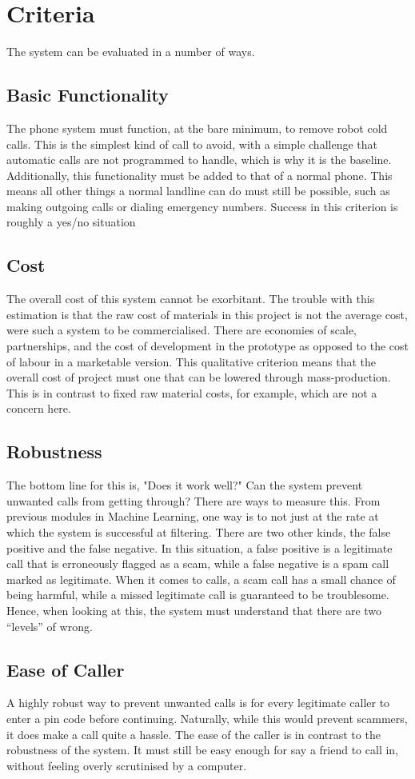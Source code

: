 \documentclass[12pt,a4paper]{report}
\begin{document}
\section{Criteria}
The system can be evaluated in a number of ways.
\subsection{Basic Functionality}
The phone system must function, at the bare minimum, to remove robot cold calls. This is the simplest kind of call to avoid, with a simple challenge that automatic calls are not programmed to handle, which is why it is the baseline. Additionally, this functionality must be added to that of a normal phone. This means all other things a normal landline can do must still be possible, such as making outgoing calls or dialing emergency numbers. Success in this criterion is roughly a yes/no situation
\subsection{Cost}
The overall cost of this system cannot be exorbitant. The trouble with this estimation is that the raw cost of materials in this project is not the average cost, were such a system to be commercialised. There are economies of scale, partnerships, and the cost of development in the prototype as opposed to the cost of labour in a marketable version. This qualitative criterion means that the overall cost of project must one that can be lowered through mass-production. This is in contrast to fixed raw material costs, for example, which are not a concern here.
\subsection{Robustness}
The bottom line for this is, "Does it work well?" Can the system prevent unwanted calls from getting through? There are ways to measure this. From previous modules in Machine Learning, one way is to not just at the rate at which the system is successful at filtering. There are two other kinds, the false positive and the false negative. In this situation, a false positive is a legitimate call that is erroneously flagged as a scam, while a false negative is a spam call marked as legitimate. When it comes to calls, a scam call has a small chance of being harmful, while a missed legitimate call is guaranteed to be troublesome. Hence, when looking at this, the system must understand that there are two ``levels'' of wrong.
\subsection{Ease of Caller}
A highly robust way to prevent unwanted calls is for every legitimate caller to enter a pin code before continuing. Naturally, while this would prevent scammers, it does make a call quite a hassle. The ease of the caller is in contrast to the robustness of the system. It must still be easy enough for say a friend to call in, without feeling overly scrutinised by a computer.
\end{document}
